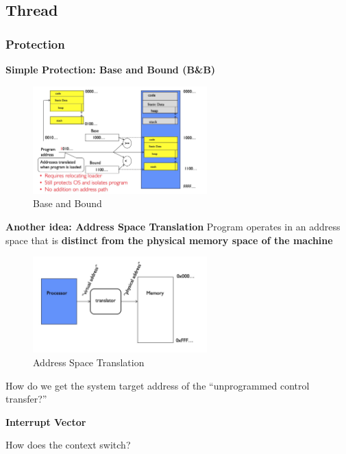 \subsection{Thread}
\subsubsection{Protection}
\textbf{Simple Protection: Base and Bound (B\&B)}
\begin{figure}[H]
    \centering
    \includegraphics[width = 0.6\textwidth ]{figures/base_bound.jpg}
    \caption{Base and Bound}
\end{figure}

\textbf{Another idea: Address Space Translation}
Program operates in an address space that is \textbf{distinct from the physical memory space of the machine}
\begin{figure}[H]
    \centering
    \includegraphics[width = 0.6\textwidth ]{figures/address_space_translation.jpg}
    \caption{Address Space Translation}
\end{figure}

\begin{tcolorbox}
\begin{discussion}
How do we get the system target address of the
``unprogrammed control transfer?''
\end{discussion}    
\textbf{Interrupt Vector}
\end{tcolorbox}
\begin{example}
How does the context switch?
\end{example}

